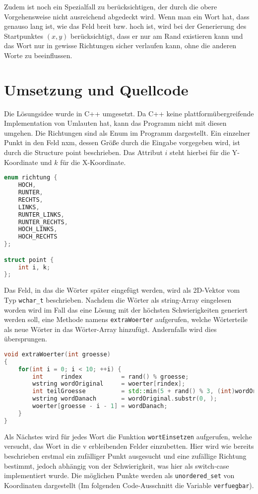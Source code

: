 \documentclass[a4paper,10pt,ngerman]{scrartcl}
\begin{document}
Zudem ist noch ein Spezialfall zu berücksichtigen, der durch die obere Vorgehensweise nicht ausreichend abgedeckt wird. Wenn man ein Wort hat, dass genauso lang ist, wie das Feld breit bzw. hoch ist, wird bei der Generierung des Startpunktes $(x,y)$ berücksichtigt, dass er nur am Rand existieren kann und das Wort nur in gewisse Richtungen sicher verlaufen kann, ohne die anderen Worte zu beeinflussen.

\section{Umsetzung und Quellcode}
Die Lösungsidee wurde in C++ umgesetzt. Da C++ keine plattformübergreifende Implementation von Umlauten hat, kann das Programm nicht mit diesen umgehen. Die Richtungen sind als Enum im Programm dargestellt. Ein einzelner Punkt in den Feld nxm, dessen Größe durch die Eingabe vorgegeben wird, ist durch die Structure point beschrieben. Das Attribut $i$ steht hierbei für die Y-Koordinate und $k$ für die X-Koordinate.

\begin{lstlisting}[language=C++]
enum richtung {
    HOCH,
    RUNTER,
    RECHTS,
    LINKS,
    RUNTER_LINKS,
    RUNTER_RECHTS,
    HOCH_LINKS,
    HOCH_RECHTS
};

struct point {
    int i, k;
};
\end{lstlisting}

Das Feld, in das die Wörter später eingefügt werden, wird als 2D-Vektor vom Typ \lstinline{wchar_t} beschrieben. Nachdem die Wörter als string-Array eingelesen worden wird im Fall das eine Lösung mit der höchsten Schwierigkeiten generiert werden soll, eine Methode namens \lstinline{extraWoerter} aufgerufen, welche Wörterteile als neue Wörter in das Wörter-Array hinzufügt. Andernfalls wird dies übersprungen.

\begin{lstlisting}[language=C++]
void extraWoerter(int groesse)
{
    for(int i = 0; i < 10; ++i) {
        int     rindex           = rand() % groesse;
        wstring wordOriginal     = woerter[rindex];
        int teilGroesse          = std::min(5 + rand() % 3, (int)wordOriginal.size() - 1);
        wstring wordDanach       = wordOriginal.substr(0, );
        woerter[groesse - i - 1] = wordDanach;
    }
}
\end{lstlisting}

Als Nächstes wird für jedes Wort die Funktion \lstinline{wortEinsetzen} aufgerufen, welche versucht, das Wort in die v
erbleibenden Felder einzubetten. Hier wird wie bereits beschrieben erstmal ein zufälliger Punkt ausgesucht und eine zufällige Richtung bestimmt, jedoch abhängig von der Schwierigkeit, 
was hier als switch-case implementiert wurde.
Die möglichen Punkte werden als \lstinline{unordered_set} von Koordinaten dargestellt (Im folgenden Code-Ausschnitt die Variable \lstinline{verfuegbar}). 
\end{document}
